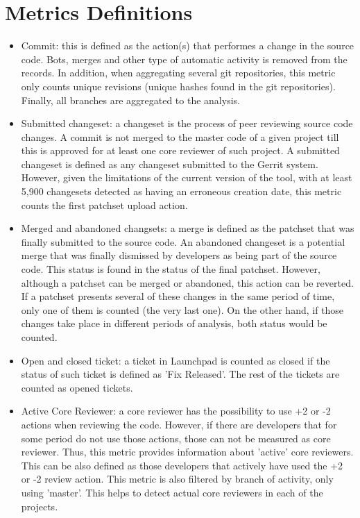 \documentclass[a4wide,11pt]{report}
\begin{document}
\newpage

\appendix{}

\chapter{Metrics Definitions}
\label{chap:metrics_definitions}

\begin{itemize}
\item Commit: this is defined as the action(s) that performes a change in the source code. 
Bots, merges and other type of automatic activity is removed from the records. In addition,
when aggregating several git repositories, this metric only counts unique revisions (unique hashes found in the git repositories).
Finally, all branches are aggregated to the analysis.

\item Submitted changeset: a changeset is the process of peer reviewing source code changes. A commit
is not merged to the master code of a given project till this is approved for at least one core
reviewer of such project. A submitted changeset is defined as any changeset submitted to the Gerrit
system. However, given the limitations of the current version of the tool, with at least 5,900 changesets
detected as having an erroneous creation date, this metric counts the first patchset upload action. 
 
\item Merged and abandoned changsets: a merge is defined as the patchset that was finally submitted to the 
source code. An abandoned changeset is a potential merge that was finally dismissed by developers as
being part of the source code. This status is found in the status of the final patchset. However, although
a patchset can be merged or abandoned, this action can be reverted. If a patchset presents several of 
these changes in the same period of time, only one of them is counted (the very last one). On the other hand,
if those changes take place in different periods of analysis, both status would be counted.

\item Open and closed ticket: a ticket in Launchpad is counted as closed if the status of such ticket is defined as 'Fix Released'.
The rest of the tickets are counted as opened tickets.

\item Active Core Reviewer: a core reviewer has the possibility to use +2 or -2 actions when reviewing the code. 
However, if there are developers that for some period do not use those actions, those can not be measured as core reviewer.
Thus, this metric provides information about 'active' core reviewers. This can be also defined as those developers
that actively have used the +2 or -2 review action. This metric is also filtered by branch of activity, only using 'master'.
This helps to detect actual core reviewers in each of the projects.


\end{itemize}
\end{document}
